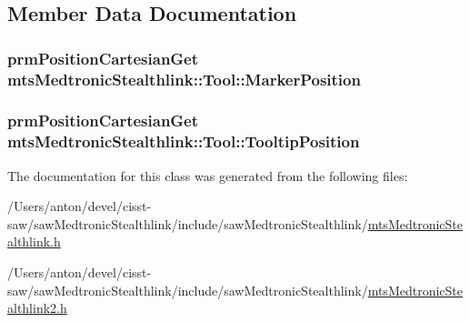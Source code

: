 \subsection{Member Data Documentation}
\hypertarget{classmts_medtronic_stealthlink_1_1_tool_ac1e88de569626cdb66f345ebeffc6228}{}
\subsubsection[{Marker\+Position}]{\setlength{\rightskip}{0pt plus 5cm}prm\+Position\+Cartesian\+Get mts\+Medtronic\+Stealthlink\+::\+Tool\+::\+Marker\+Position}\label{classmts_medtronic_stealthlink_1_1_tool_ac1e88de569626cdb66f345ebeffc6228}
\hypertarget{classmts_medtronic_stealthlink_1_1_tool_acf9d37a43587bf06a4b596d77feabd9f}{}
\subsubsection[{Tooltip\+Position}]{\setlength{\rightskip}{0pt plus 5cm}prm\+Position\+Cartesian\+Get mts\+Medtronic\+Stealthlink\+::\+Tool\+::\+Tooltip\+Position}\label{classmts_medtronic_stealthlink_1_1_tool_acf9d37a43587bf06a4b596d77feabd9f}


The documentation for this class was generated from the following files\+:\begin{DoxyCompactItemize}
\item 
/\+Users/anton/devel/cisst-\/saw/saw\+Medtronic\+Stealthlink/include/saw\+Medtronic\+Stealthlink/\hyperlink{mts_medtronic_stealthlink_8h}{mts\+Medtronic\+Stealthlink.\+h}\item 
/\+Users/anton/devel/cisst-\/saw/saw\+Medtronic\+Stealthlink/include/saw\+Medtronic\+Stealthlink/\hyperlink{mts_medtronic_stealthlink2_8h}{mts\+Medtronic\+Stealthlink2.\+h}\end{DoxyCompactItemize}
